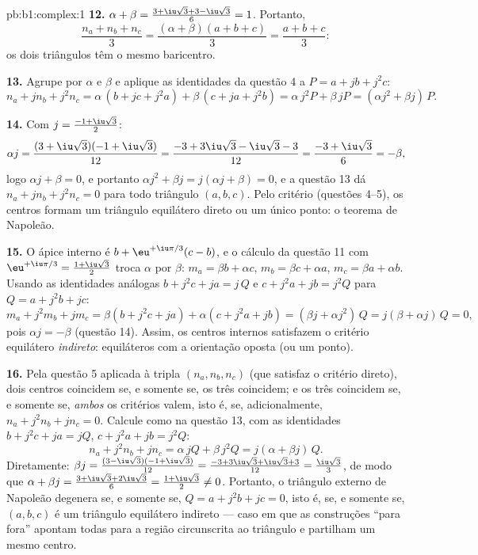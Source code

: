 \begin{solution}{pb:b1:complex:1}
\textbf{12.} $\alpha + \beta = \frac{3 + \iu\sqrt3 + 3 -
\iu\sqrt3}6 = 1$. Portanto,
\[
\frac{n_a + n_b + n_c}3
= \frac{(\alpha + \beta)(a + b + c)}3 = \frac{a + b + c}3 :
\]
os dois triângulos têm o mesmo baricentro.

\textbf{13.} Agrupe por $\alpha$ e $\beta$ e aplique as identidades da
questão 4 a $P = a + jb + j^2c$:
\[
n_a + j n_b + j^2 n_c
= \alpha\,(b + jc + j^2 a) + \beta\,(c + ja + j^2 b)
= \alpha\,j^2 P + \beta\,j P
= (\alpha j^2 + \beta j)\,P .
\]

\textbf{14.} Com $j = \frac{-1 + \iu\sqrt3}2$:
\[
\alpha j = \frac{(3 + \iu\sqrt3)(-1 + \iu\sqrt3)}{12}
= \frac{-3 + 3\iu\sqrt3 - \iu\sqrt3 - 3}{12}
= \frac{-3 + \iu\sqrt3}6 = -\beta ,
\]
logo $\alpha j + \beta = 0$, e portanto $\alpha j^2 + \beta j = j(\alpha j
+ \beta) = 0$, e a questão 13 dá $n_a + jn_b + j^2n_c = 0$ para
todo triângulo $(a, b, c)$. Pelo critério (questões 4--5), os
centros formam um triângulo equilátero direto ou um único ponto:
o teorema de Napoleão.

\textbf{15.} O ápice interno é $b + \eu^{+\iu\pi/3}(c - b)$, e
o cálculo da questão 11 com $\eu^{+\iu\pi/3} = \frac{1 +
\iu\sqrt3}2$ troca $\alpha$ por $\beta$: $m_a = \beta b + \alpha
c$, $m_b = \beta c + \alpha a$, $m_c = \beta a + \alpha b$. Usando
as identidades análogas $b + j^2c + ja = j\,Q$ e $c + j^2a + jb
= j^2 Q$ para $Q = a + j^2b + jc$:
\[
m_a + j^2 m_b + j m_c
= \beta(b + j^2 c + ja) + \alpha(c + j^2 a + jb)
= (\beta j + \alpha j^2)\, Q = j(\beta + \alpha j)\,Q = 0 ,
\]
pois $\alpha j = -\beta$ (questão 14). Assim, os centros internos
satisfazem o critério equilátero \emph{indireto}: equiláteros com
a orientação oposta (ou um ponto).

\textbf{16.} Pela questão 5 aplicada à tripla $(n_a, n_b, n_c)$
(que satisfaz o critério direto), dois centros coincidem se, e somente
se, os três coincidem; e os três coincidem se, e somente se, \emph{ambos}
os critérios valem, isto é, se, adicionalmente, $n_a + j^2 n_b + j n_c = 0$. Calcule como na
questão 13, com as identidades $b + j^2c + ja = jQ$, $c + j^2a +
jb = j^2Q$:
\[
n_a + j^2 n_b + j n_c
= \alpha\,jQ + \beta\,j^2 Q = j(\alpha + \beta j)\,Q .
\]
Diretamente: $\beta j = \frac{(3 -
\iu\sqrt3)(-1 + \iu\sqrt3)}{12} = \frac{-3 + 3\iu\sqrt3 +
\iu\sqrt3 + 3}{12} = \frac{\iu\sqrt3}3$, de modo que $\alpha + \beta j =
\frac{3 + \iu\sqrt3 + 2\iu\sqrt3}6 = \frac{1 + \iu\sqrt3}2 \neq
0$. Portanto, o triângulo externo de Napoleão degenera se, e
somente se, $Q = a +
j^2b + jc = 0$, isto é, se, e somente se, $(a, b, c)$ é um triângulo equilátero indireto --- caso em que as
construções ``para fora'' apontam todas para a região circunscrita ao
triângulo e partilham um mesmo centro.


\end{solution}
